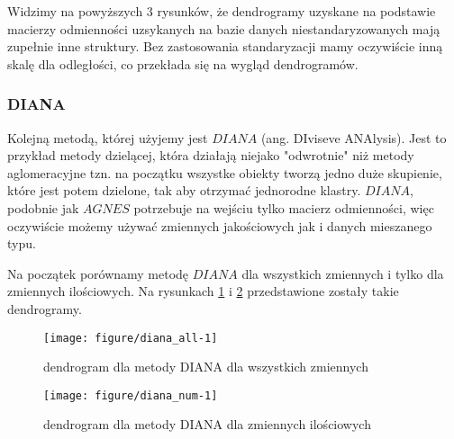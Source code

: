 \documentclass[12pt, a4paper]{article}\usepackage[]{graphicx}\usepackage[]{xcolor}
\makeatletter
\def\maxwidth{ %
  \ifdim\Gin@nat@width>\linewidth
    \linewidth
  \else
    \Gin@nat@width
  \fi
}
\newenvironment{knitrout}{}{} %
\makeatother
\begin{document}
Widzimy na powyższych $3$ rysunków, że dendrogramy uzyskane na podstawie macierzy odmienności uzsykanych na bazie danych niestandaryzowanych mają zupełnie inne struktury. Bez zastosowania standaryzacji mamy oczywiście inną skalę dla odległości, co przekłada się na wygląd dendrogramów.



\subsubsection{DIANA}

Kolejną metodą, której użyjemy jest $DIANA$ (ang. DIviseve ANAlysis). Jest to przykład metody dzielącej, która działają niejako "odwrotnie" niż metody aglomeracyjne tzn. na początku wszystke obiekty tworzą jedno duże skupienie, które jest potem dzielone, tak aby otrzymać jednorodne klastry. $DIANA$, podobnie jak $AGNES$ potrzebuje na wejściu tylko macierz odmienności, więc oczywiście możemy używać zmiennych jakościowych jak i danych mieszanego typu.

\par Na początek porównamy metodę $DIANA$ dla wszystkich zmiennych i tylko dla zmiennych ilościowych. Na rysunkach \ref{fig:diana_all} i \ref{fig:diana_num} przedstawione zostały takie dendrogramy. 


\begin{knitrout}
\color{fgcolor}\begin{figure}[H]

{\centering \texttt{[image: figure/diana\_all-1]} 

}

\caption[dendrogram dla metody DIANA dla wszystkich zmiennych]{dendrogram dla metody DIANA dla wszystkich zmiennych}\label{fig:diana_all}
\end{figure}

\end{knitrout}

\begin{knitrout}
\color{fgcolor}\begin{figure}[H]

{\centering \texttt{[image: figure/diana\_num-1]} 

}

\caption[dendrogram dla metody DIANA dla zmiennych ilościowych]{dendrogram dla metody DIANA dla zmiennych ilościowych}\label{fig:diana_num}
\end{figure}

\end{knitrout}
\end{document}
